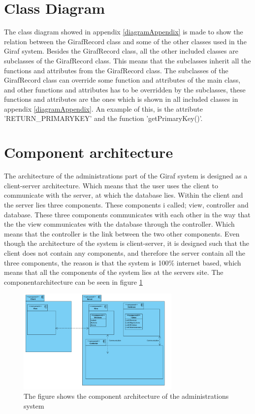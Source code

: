 \section{Class Diagram}

The class diagram showed in appendix \ref{diagramAppendix} is made to show the relation between the GirafRecord class and some of the other classes used in the Giraf system.
Besides the GirafRecord class, all the other included classes are subclasses of the GirafRecord class. This means that the subclasses inherit all the functions and attributes from the GirafRecord class.
The subclasses of the GirafRecord class can override some function and attributes of the main class, and other functions and attributes has to be overridden by the subclasses, these functions and attributes are the ones which is shown in all included classes in appendix \ref{diagramAppendix}.
An example of this, is the attribute 'RETURN\_PRIMARYKEY' and the function 'getPrimaryKey()'.
   
\section{Component architecture}

The architecture of the administrations part of the Giraf system is designed as a client-server architecture. Which means that the user uses the client to communicate with the server, at which the database lies. Within the client and the server lies three components. These components i called; view, controller and database. These three components communicates with each other in the way that the the view communicates with the database through the controller. Which means that the controller is the link between the two other components. Even though the architecture of the system is client-server, it is designed such that the client does not contain any components, and therefore the server contain all the three components, the reason is that the system is 100\% internet based, which means that all the components of the system lies at the servers site. The componentarchitecture can be seen in figure \ref{fig:architecture}

\begin{figure}[!h]
\centering
\includegraphics[width=300px]{img/ComponentArketektur.png}
\caption{The figure shows the component architecture of the administrations system}
\label{fig:architecture}
\end{figure}

